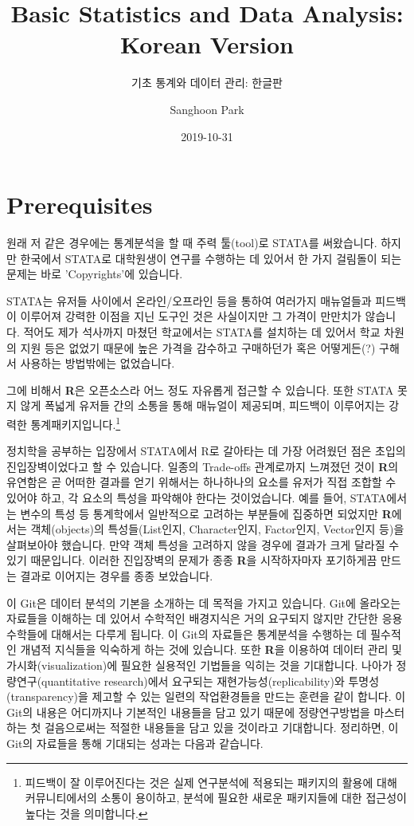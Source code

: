\documentclass[]{book}
\title{Basic Statistics and Data Analysis: Korean Version}
\subtitle{기초 통계와 데이터 관리: 한글판}
\author{Sanghoon Park}
\date{2019-10-31}
\let\rmarkdownfootnote\footnote%
\def\footnote{\protect\rmarkdownfootnote}
\begin{document}
\maketitle

{
\hypersetup{linkcolor=black}
\setcounter{tocdepth}{1}
\tableofcontents
}
\hypertarget{prerequisites}{%
\chapter{Prerequisites}\label{prerequisites}}

원래 저 같은 경우에는 통계분석을 할 때 주력 툴(tool)로 STATA를 써왔습니다. 하지만 한국에서 STATA로 대학원생이 연구를 수행하는 데 있어서 한 가지 걸림돌이 되는 문제는 바로 'Copyrights'에 있습니다.

STATA는 유저들 사이에서 온라인/오프라인 등을 통하여 여러가지 매뉴얼들과 피드백이 이루어져 강력한 이점을 지닌 도구인 것은 사실이지만 그 가격이 만만치가 않습니다. 적어도 제가 석사까지 마쳤던 학교에서는 STATA를 설치하는 데 있어서 학교 차원의 지원 등은 없었기 때문에 높은 가격을 감수하고 구매하던가 혹은 어떻게든(?) 구해서 사용하는 방법밖에는 없었습니다.

그에 비해서 \textbf{R}은 오픈소스라 어느 정도 자유롭게 접근할 수 있습니다. 또한 STATA 못지 않게 폭넓게 유저들 간의 소통을 통해 매뉴얼이 제공되며, 피드백이 이루어지는 강력한 통계패키지입니다.\footnote{피드백이 잘 이루어진다는 것은 실제 연구분석에 적용되는 패키지의 활용에 대해 커뮤니티에서의 소통이 용이하고, 분석에 필요한 새로운 패키지들에 대한 접근성이 높다는 것을 의미합니다.}

정치학을 공부하는 입장에서 STATA에서 R로 갈아타는 데 가장 어려웠던 점은 초입의 진입장벽이었다고 할 수 있습니다. 일종의 Trade-offs 관계로까지 느껴졌던 것이 \textbf{R}의 유연함은 곧 어떠한 결과를 얻기 위해서는 하나하나의 요소를 유저가 직접 조합할 수 있어야 하고, 각 요소의 특성을 파악해야 한다는 것이었습니다. 예를 들어, STATA에서는 변수의 특성 등 통계학에서 일반적으로 고려하는 부분들에 집중하면 되었지만 \textbf{R}에서는 객체(objects)의 특성들(List인지, Character인지, Factor인지, Vector인지 등)을 살펴보아야 했습니다. 만약 객체 특성을 고려하지 않을 경우에 결과가 크게 달라질 수 있기 때문입니다. 이러한 진입장벽의 문제가 종종 \textbf{R}을 시작하자마자 포기하게끔 만드는 결과로 이어지는 경우를 종종 보았습니다.

이 Git은 데이터 분석의 기본을 소개하는 데 목적을 가지고 있습니다. Git에 올라오는 자료들을 이해하는 데 있어서 수학적인 배경지식은 거의 요구되지 않지만 간단한 응용수학들에 대해서는 다루게 됩니다. 이 Git의 자료들은 통계분석을 수행하는 데 필수적인 개념적 지식들을 익숙하게 하는 것에 있습니다. 또한 \textbf{R}을 이용하여 데이터 관리 및 가시화(visualization)에 필요한 실용적인 기법들을 익히는 것을 기대합니다. 나아가 정량연구(quantitative research)에서 요구되는 재현가능성(replicability)와 투명성(transparency)을 제고할 수 있는 일련의 작업환경들을 만드는 훈련을 같이 합니다. 이 Git의 내용은 어디까지나 기본적인 내용들을 담고 있기 때문에 정량연구방법을 마스터하는 첫 걸음으로써는 적절한 내용들을 담고 있을 것이라고 기대합니다. 정리하면, 이 Git의 자료들을 통해 기대되는 성과는 다음과 같습니다.
\end{document}
